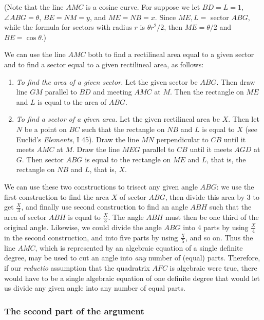 \documentclass[twoside,openright]{article}
\begin{document}
\label{begca}
(Note that the line $AMC$ is a cosine curve.  For suppose we let
$BD = L = 1$, $\angle ABG = \theta$, $BE = NM = y$, and $ME = NB = x$. Since $ME,L=$ sector $ABG$, while the formula for sectors with radius $r$ is $\theta r^2/2$, then $ME = \theta/2$ and $BE = \cos \theta$.)

We can use the line $AMC$ both to find a rectilineal area equal to a
given sector and to find a sector equal to a given rectilineal area,
as follows:
\begin{enumerate}
\item {\em To find the area of a given sector.}  Let the given sector
  be $ABG$.  Then draw line $GM$ parallel to $BD$ and meeting $AMC$ at
  $M$.  Then the rectangle on $ME$ and $L$ is equal to the area of
  $ABG$.
\item {\em To find a sector of a given area.}  Let the given
  rectilineal area be $X$.  Then let $N$ be a point on $BC$ such that
  the rectangle on $NB$ and $L$ is equal to $X$ (see Euclid's {\em
    Elements}, I 45).  Draw the line $MN$ perpendicular to $CB$ until
  it meets $AMC$ at $M$.  Draw the line $MEG$ parallel to $CB$ until
  it meets $AGD$ at $G$.  Then sector $ABG$ is equal to the rectangle
  on $ME$ and $L$, that is, the rectangle on $NB$ and $L$, that is,
  $X$.
\end{enumerate}
We can use these two constructions to trisect any given angle $ABG$:
we use the first construction to find the area $X$ of sector $ABG$,
then divide this area by 3 to get $\frac{X}{3}$, and finally use
second construction to find an angle $ABH$ such that the area of
sector $ABH$ is equal to $\frac{X}{3}$.  The angle $ABH$ must then be
one third of the original angle.  Likewise, we could divide the angle
$ABG$ into 4 parts by using $\frac{X}{4}$ in the second construction,
and into five parts by using $\frac{X}{5}$, and so on.  Thus the line
$AMC$, which is represented by an algebraic equation of a single
definite degree, may be used to cut an angle into {\em any} number of
(equal) parts.  Therefore, if our {\em reductio} assumption that the
quadratrix $AFC$ is algebraic were true, there would have to be a
single algebraic equation of one definite degree that would let us
divide any given angle into any number of equal parts.
\label{endca}

\subsubsection*{The second part of the argument}
\end{document}
